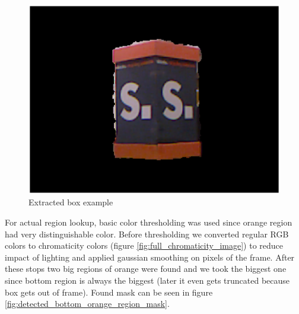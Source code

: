 \documentclass{article}
\begin{document}
\begin{figure}[h!]
  \centering
  \includegraphics[width=1.0\textwidth]{figs/extracted_box_example}
  \caption{Extracted box example}
  \label{fig:extracted_box_example}
\end{figure}


For actual region lookup, basic color thresholding was used
since orange region had very distinguishable color. Before 
thresholding we converted regular RGB colors
to chromaticity colors (figure \ref{fig:full_chromaticity_image}) to reduce impact of lighting
and applied gaussian smoothing on pixels of
the frame. After these stops two big regions of
orange were found and we took the biggest one
since bottom region is always the biggest (later it 
even gets truncated because box gets out of frame).
Found mask can be seen in figure \ref{fig:detected_bottom_orange_region_mask}.
\end{document}
